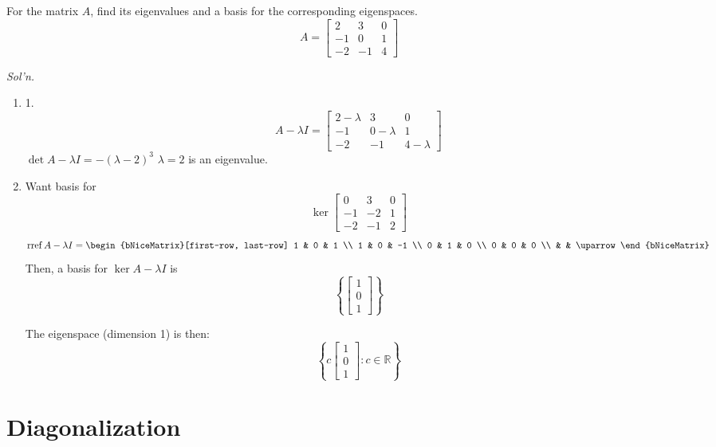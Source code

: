 \documentclass[../main.tex]{subfiles}
\begin{document}
\begin{example}
    For the matrix \( A \), find its eigenvalues and a basis for the corresponding eigenspaces.
    \[ A = \begin{bmatrix}
        2 & 3 & 0 \\
        -1 & 0 & 1 \\
        -2 & -1 & 4
    \end{bmatrix} \]

    \textit{Sol'n.}
    \begin{enumerate}
        \item 1. \[ A - \lambda I = \begin{bmatrix}
            2 - \lambda & 3 & 0 \\
            -1 & 0 - \lambda & 1 \\
            -2 & -1 & 4 - \lambda
        \end{bmatrix} \]
        \( \det A - \lambda I = -(\lambda-2)^3  \)
        \( \lambda = 2 \) is an eigenvalue.

        \item Want basis for \[ \ker \begin{bmatrix}
            0 & 3 & 0 \\
            -1 & -2 & 1 \\
            -2 & -1 & 2
        \end{bmatrix} \]
        \[ \rref A - \lambda I = \begin{bNiceMatrix}[first-row, last-row]
            1 & 0 & 1 \\
            1 & 0 & -1 \\
            0 & 1 & 0 \\
            0 & 0 & 0 \\
            & & \uparrow
        \end{bNiceMatrix} \]
        Then, a basis for  \( \ker A - \lambda I \) is
        \[ \left\{ \begin{bmatrix}
            1 \\ 0 \\ 1
        \end{bmatrix} \right\} \]

        The eigenspace (dimension 1) is then:
        \[ \left\{ c \begin{bmatrix}
            1 \\ 0 \\ 1
        \end{bmatrix} : c \in \mathbb{R} \right\} \]
    \end{enumerate}
\end{example}


\section{Diagonalization}
\end{document}
